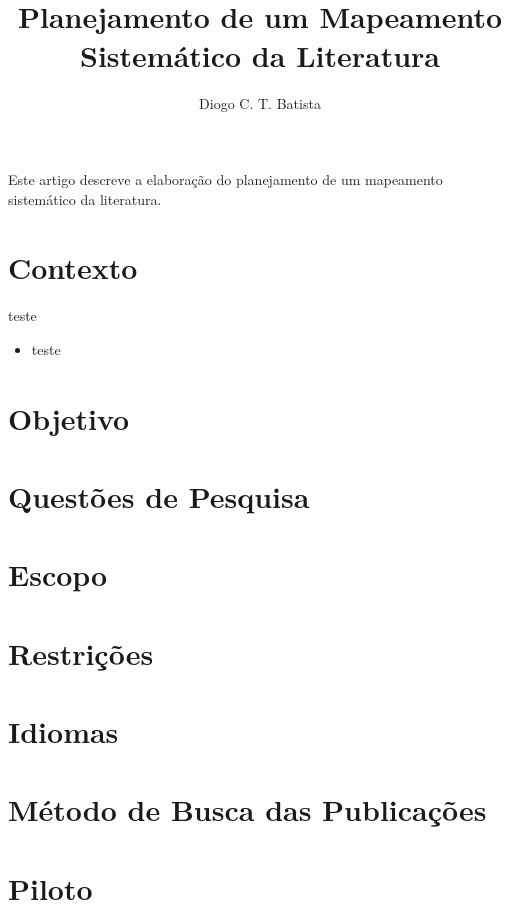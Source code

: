\documentclass[12pt]{article}
\title{Planejamento de um Mapeamento Sistemático da Literatura}
\author{Diogo C. T. Batista\inst{1}}
\begin{document}
\maketitle

\begin{resumo}
  Este artigo descreve a elaboração do planejamento de um mapeamento sistemático da literatura.
\end{resumo}


\section{Contexto}

teste

\begin{itemize}
\item teste
\end{itemize}

\section{Objetivo}

\section{Questões de Pesquisa}

\section{Escopo}

\section{Restrições}

\section{Idiomas}

\section{Método de Busca das Publicações}

\section{Piloto}



\end{document}
